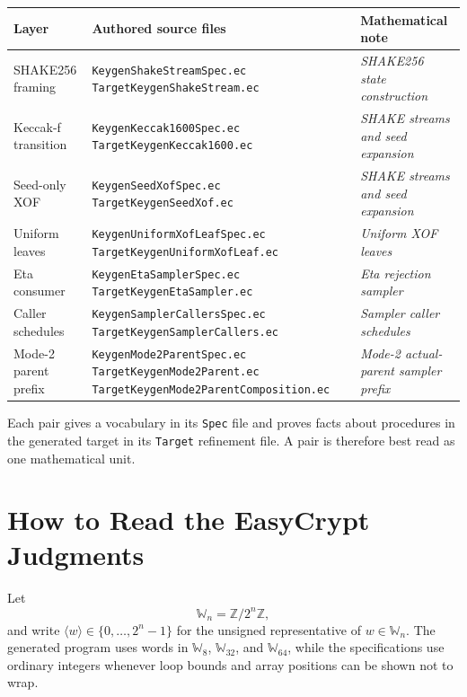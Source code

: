 \documentclass[11pt]{article}
\theoremstyle{definition}
\theoremstyle{plain}
\theoremstyle{remark}
\newcommand{\code}[1]{\nolinkurl{#1}}
\newcommand{\Z}{\mathbb Z}
\newcommand{\W}[1]{\mathbb W_{#1}}
\newcommand{\uint}[1]{\langle #1\rangle}
\begin{document}
\begin{center}
\begin{tabularx}{\textwidth}{>{\raggedright\arraybackslash}p{}
  >{\raggedright\arraybackslash}p{}X}
\toprule
Layer & Authored source files & Mathematical note \\
\midrule
SHAKE256 framing &
\code{KeygenShakeStreamSpec.ec}\newline
\code{TargetKeygenShakeStream.ec} &
\emph{SHAKE256 state construction} \\
Keccak-f transition &
\code{KeygenKeccak1600Spec.ec}\newline
\code{TargetKeygenKeccak1600.ec} &
\emph{SHAKE streams and seed expansion} \\
Seed-only XOF &
\code{KeygenSeedXofSpec.ec}\newline
\code{TargetKeygenSeedXof.ec} &
\emph{SHAKE streams and seed expansion} \\
Uniform leaves &
\code{KeygenUniformXofLeafSpec.ec}\newline
\code{TargetKeygenUniformXofLeaf.ec} &
\emph{Uniform XOF leaves} \\
Eta consumer &
\code{KeygenEtaSamplerSpec.ec}\newline
\code{TargetKeygenEtaSampler.ec} &
\emph{Eta rejection sampler} \\
Caller schedules &
\code{KeygenSamplerCallersSpec.ec}\newline
\code{TargetKeygenSamplerCallers.ec} &
\emph{Sampler caller schedules} \\
Mode-2 parent prefix &
\code{KeygenMode2ParentSpec.ec}\newline
\code{TargetKeygenMode2Parent.ec}\newline
{\scriptsize\code{TargetKeygenMode2ParentComposition.ec}} &
\emph{Mode-2 actual-parent sampler prefix} \\
\bottomrule
\end{tabularx}
\end{center}

Each pair gives a vocabulary in its \code{Spec} file and proves facts about
procedures in the generated target in its \code{Target} refinement file.  A
pair is therefore best read as one mathematical unit.

\section{How to Read the EasyCrypt Judgments}

Let
\[
  \W n=\Z/2^n\Z,
\]
and write $\uint w\in\{0,\ldots,2^n-1\}$ for the unsigned representative of
$w\in\W n$.  The generated program uses words in $\W8$, $\W{32}$, and
$\W{64}$, while the specifications use ordinary integers whenever loop bounds
and array positions can be shown not to wrap.
\end{document}

